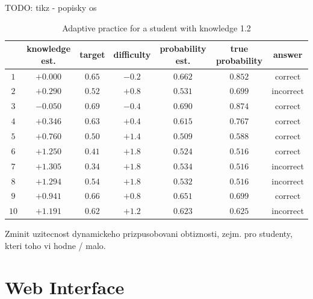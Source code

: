 \documentclass[a4paper, 12pt, twoside]{fithesis2}		%
\renewcommand{\_}{\leavevmode \kern0.07em\vbox{\hrule width0.4em}}
\begin{document}
TODO: tikz - popisky os

\begin{table}[h]
\begin{center}
\begin{tabular}{| c | c | c | c | c | c | c |}
  \hline
  & knowledge est. &  target & difficulty & probability est. & true probability & answer\\
  \hline \hline
  $1$ & $+0.000$ & $0.65$ & $-0.2$ & $0.662$ & $0.852$ &  correct   \\ \hline
  $2$ & $+0.290$ & $0.52$ & $+0.8$ & $0.531$ & $0.699$ &  incorrect \\ \hline
  $3$ & $-0.050$ & $0.69$ & $-0.4$ & $0.690$ & $0.874$ &  correct   \\ \hline
  $4$ & $+0.346$ & $0.63$ & $+0.4$ & $0.615$ & $0.767$ &  correct   \\ \hline
  $5$ & $+0.760$ & $0.50$ & $+1.4$ & $0.509$ & $0.588$ &  correct   \\ \hline
  $6$ & $+1.250$ & $0.41$ & $+1.8$ & $0.524$ & $0.516$ &  correct   \\ \hline
  $7$ & $+1.305$ & $0.34$ & $+1.8$ & $0.534$ & $0.516$ &  incorrect \\ \hline
  $8$ & $+1.294$ & $0.54$ & $+1.8$ & $0.532$ & $0.516$ &  incorrect \\ \hline
  $9$ & $+0.941$ & $0.66$ & $+0.8$ & $0.651$ & $0.699$ &  correct   \\ \hline
 $10$ & $+1.191$ & $0.62$ & $+1.2$ & $0.623$ & $0.625$ &  incorrect \\ \hline
\end{tabular}
\end{center}
\caption{Adaptive practice for a student with knowledge 1.2}
\end{table}


Zminit uzitecnost dynamickeho prizpusobovani obtiznosti, zejm. pro studenty, kteri toho vi hodne / malo.




\section{Web Interface}
\label{sec:smartoo-web}
\end{document}

